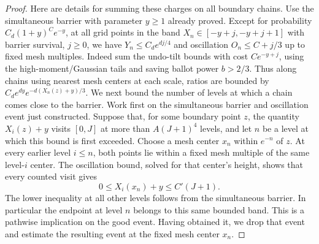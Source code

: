 \begin{proof}
Here are details for summing these charges on all boundary chains.
Use the simultaneous barrier with parameter \(y\ge1\) already proved.
Except for probability \(C_d(1+y)^C e^{-y}\), at all grid points in the band \(X_n\in[-y+j,-y+j+1]\) with barrier survival, \(j\ge0\), we have \(Y_n\le C_d e^{d j/4}\) and oscillation \(O_n\le C+j/3\) up to fixed mesh multiples.
Indeed sum the undo-tilt bounds with cost \(C e^{-y+j}\), using the high-moment/Gaussian tails and saving ballot power \(b>2/3\).
Thus along chains using nearest mesh centers at each scale, ratios are bounded by \(C_d e^{dy}e^{-d(X_n(z)+y)/3}\).
We next bound the number of levels at which a chain comes close to the
barrier.  Work first on the simultaneous barrier and oscillation event just
constructed.  Suppose that, for some boundary point $z$, the quantity
$X_i(z)+y$ visits $[0,J]$ at more than $A(J+1)^4$ levels, and let $n$ be a
level at which this bound is first exceeded.  Choose a mesh center $x_n$
within $e^{-n}$ of $z$.  At every earlier level $i\leq n$, both points lie
within a fixed mesh multiple of the same level-$i$ center.  The oscillation
bound, solved for that center's height, shows that every counted visit
gives
\[
 0\leq X_i(x_n)+y\leq C'(J+1).
\]
The lower inequality at all other levels follows from the simultaneous
barrier.  In particular the endpoint at level $n$ belongs to this same
bounded band.  This is a pathwise implication on the good event.  Having
obtained it, we drop that event and estimate the resulting event at the
fixed mesh center $x_n$.


\end{proof}
